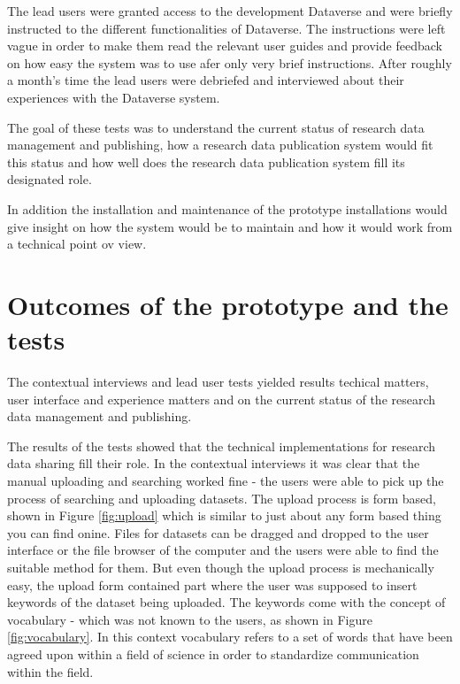 The lead users were granted access to the development Dataverse and were
briefly instructed to the different functionalities of Dataverse. The
instructions were left vague in order to make them read the relevant user
guides and provide feedback on how easy the system was to use afer only very
brief instructions. After roughly a month's time the lead users were debriefed
and interviewed about their experiences with the Dataverse system.

The goal of these tests was to understand the current status of research data
management and publishing, how a research data publication system would fit
this status and how well does the research data publication system fill its
designated role.

In addition the installation and maintenance of the prototype installations
would give insight on how the system would be to maintain and how it would work
from a technical point ov view.

\section{Outcomes of the prototype and the tests}
\label{sec:prototype_outcomes}

The contextual interviews and lead user tests yielded results techical matters,
user interface and experience matters and on the current status of the research
data management and publishing.

The results of the tests showed that the technical implementations for research
data sharing fill their role. In the contextual interviews it was clear that
the manual uploading and searching worked fine - the users were able to pick up
the process of searching and uploading datasets. The upload process is form
based, shown in Figure \ref{fig:upload} which is similar to just about any
form based thing you can find onine. Files for datasets can be dragged and
dropped to the user interface or the file browser of the computer and the users
were able to find the suitable method for them. But even
though the upload process is mechanically easy, the upload form contained part
where the user was supposed to insert keywords of the dataset being uploaded.
The keywords come with the concept of vocabulary - which was not known to the
users, as shown in Figure \ref{fig:vocabulary}. In this context vocabulary
refers to a set of words that have been agreed upon within a field of science
in order to standardize communication within the field.

